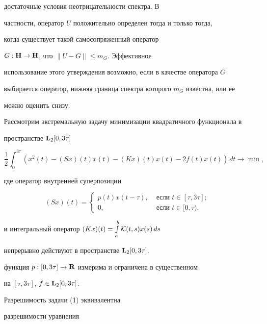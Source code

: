 достаточные условия неотрицательности спектра. В 


частности, оператор $U$ положительно определен тогда и только тогда,


когда существует такой самосопряженный оператор


$G:{\bold H}\to{\bold H}$, что $\|U-G\|\le m_G$. Эффективное 


использование этого утверждения возможно, если в качестве оператора $G$


выбирается оператор, нижняя граница спектра которого $m_G$ известна, или ее


можно оценить снизу.





\begin{exam}


Рассмотрим экстремальную задачу минимизации квадратичного функционала в


пространстве ${\bold L}_2[0,3\tau]$


\begin{equation}


\frac12\int_0^{3\tau}\left(x^2(t)-(Sx)(t)x(t)-


(Kx)(t)x(t)-2f(t)x(t)\right)\,dt


\longrightarrow\min,


\end{equation}


где оператор внутренней суперпозиции


$$(Sx)(t)=


\begin{cases}


p(t)x(t-\tau), &\text{ если }t\in[\tau,3\tau];\\


0, & \text{ если }t\in[0,\tau),


\end{cases}


$$


и интегральный оператор $(Kx)(t)=\int\limits_a^b{\cal K}(t,s)x(s)\,ds$


непрерывно действуют в пространстве ${\bold L}_2[0,3\tau]$,


функция $p:[0,3\tau]\to{\bold R}$ измерима и ограничена в существенном


на $[\tau,3\tau]$, $f\in{\bold L}_2[0,3\tau]$.


Разрешимость задачи (1) эквивалентна


разрешимости уравнения



\end{exam}
